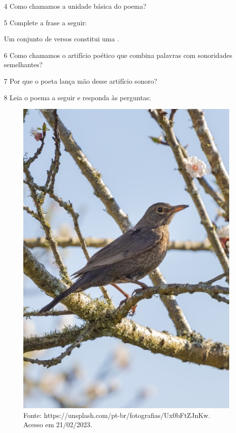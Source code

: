 \num{4} Como chamamos a unidade básica do poema?


\num{5} Complete a frase a seguir:

Um conjunto de versos constitui uma \preencher.


\num{6} Como chamamos o artifício poético que combina palavras com
sonoridades semelhantes?



\num{7} Por que o poeta lança mão desse artifício sonoro?



\num{8} Leia o poema a seguir e responda às perguntas:

\begin{figure}[htpb!]
\includegraphics[width=.5\textwidth]{./imgs/img17.jpg}
\caption{Fonte: https://unsplash.com/pt-br/fotografias/Ux0bFtZJnKw. Acesso em 21/02/2023.}
\end{figure}

